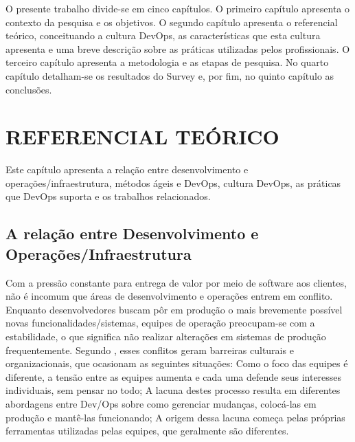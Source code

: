 \documentclass[twoside,english,brazilian]{UNISINOSartigo}
\begin{document}
O presente trabalho divide-se em cinco capítulos. O primeiro capítulo apresenta o contexto da pesquisa e os objetivos. O segundo capítulo apresenta o referencial teórico, conceituando a cultura DevOps, as características que esta cultura apresenta e uma breve descrição sobre as práticas utilizadas pelos profissionais. O terceiro capítulo apresenta a metodologia e as etapas de pesquisa. No quarto capítulo detalham-se os resultados do Survey e, por fim, no quinto capítulo as conclusões.
\section{REFERENCIAL TEÓRICO}

Este capítulo apresenta a relação entre desenvolvimento e operações/infraestrutura, métodos ágeis e DevOps, cultura DevOps, as práticas que DevOps suporta e os trabalhos relacionados.


\subsection{A relação entre Desenvolvimento  e Operações/Infraestrutura}
Com a pressão constante para entrega de valor por meio de software aos clientes, não é incomum que áreas de desenvolvimento e operações entrem em conflito. Enquanto desenvolvedores buscam pôr em produção o mais brevemente possível novas funcionalidades/sistemas, equipes de operação preocupam-se com a estabilidade, o que significa não realizar alterações em sistemas de produção frequentemente.
Segundo , esses conflitos geram barreiras culturais e organizacionais, que ocasionam as seguintes situações:
Como o foco das equipes é diferente, a tensão entre as equipes aumenta e cada uma defende seus interesses individuais, sem pensar no todo; A lacuna destes processo resulta em diferentes abordagens entre Dev/Ops sobre como gerenciar mudanças, colocá-las em produção e mantê-las funcionando; A origem dessa lacuna começa pelas próprias ferramentas utilizadas pelas equipes, que geralmente são diferentes.
\end{document}
